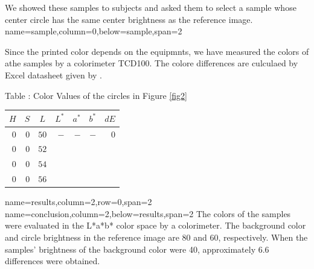 \documentclass[portrait,final,a0paper]{baposter}
\begin{document}
\begin{poster}
{ We showed these samples to subjects and
 asked them to select a sample whose center circle has the same center
 brightness as the reference image. }
 {name=sample,column=0,below=sample,span=2}
 {Since the printed color depends on the equipmnts,
 we have measured the colors of athe samples by a colorimeter
 TCD100\cite{TCD100}. The colore differences are culculaed by Excel
 datasheet given by \cite{CIEDE2000}.
  \begin{center}
Table : Color Values of the circles in
   Figure \ref{fig2}\\
 \begin{tabular}[t]{|*{7}{r|}}\hline
\multicolumn{1}{|c|}{$H$} &
\multicolumn{1}{c|}{$S$} &
\multicolumn{1}{c|}{$L$} &
\multicolumn{1}{|c|}{$L^*$} &
\multicolumn{1}{c|}{$a^*$} &
\multicolumn{1}{c|}{$b^*$} &
\multicolumn{1}{|c|}{$dE$} \\\hline
  $0$&$0$ &$50$ &$-$ &$-$ & $-$& $0$\\\hline
  $0$&$0$ &$52$ & & & & \\\hline
  $0$&$0$ &$54$ & & & & \\\hline
  $0$&$0$ &$56$ & & & & \\\hline
 \end{tabular}
\end{center}
}
 {name=results,column=2,row=0,span=2}{}
 {name=conclusion,column=2,below=results,span=2}
{The colors of the samples were
 evaluated in the L*a*b* color space by a colorimeter. The background
 color and circle brightness in the reference image are 80 and 60,
 respectively. When the samples' brightness of the background color were
 40, approximately 6.6 differences were obtained. }
\end{poster}
\end{document}
